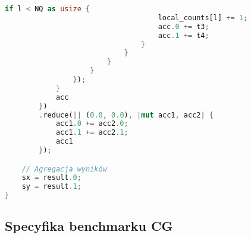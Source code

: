 \begin{lstlisting}[language=Rust, caption={Implementacja benchmarku EP w języku Rust}, label={lst:ep_rust}]
                                if l < NQ as usize {
                                    local_counts[l] += 1;
                                    acc.0 += t3;
                                    acc.1 += t4;
                                }
                            }
                        }
                    }
                });
            }
            acc
        })
        .reduce(|| (0.0, 0.0), |mut acc1, acc2| {
            acc1.0 += acc2.0;
            acc1.1 += acc2.1;
            acc1
        });

    // Agregacja wyników
    sx = result.0;
    sy = result.1;
}
\end{lstlisting}

\subsection{Specyfika benchmarku CG}
